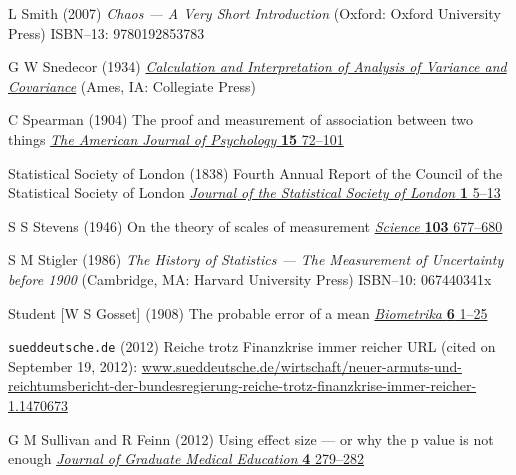 \begin{thebibliography}{99}
L Smith
(2007) \textit{Chaos --- A Very Short Introduction}
(Oxford: Oxford University Press)
ISBN--13: 9780192853783

G W Snedecor
(1934) 
\href{http://dx.doi.org/10.1037/13308-000}{\textit{Calculation 
and Interpretation of Analysis of Variance and Covariance}}
(Ames, IA: Collegiate Press)


C Spearman
(1904) The proof and measurement of association between two things
\href{http://www.jstor.org/stable/1412159}{\textit{The Ameri\-can 
Journal of Psychology} \textbf{15} 72--101}

Statistical Society of London
(1838) Fourth Annual Report of the Council of the Statistical 
Society of London
\href{http://www.jstor.org/stable/2337850}{\textit{Journal of the 
Statistical Society of London} \textbf{1} 5--13}

S S Stevens
(1946) On the theory of scales of measurement
\href{https://doi.org/10.1126/science.103.2684.677}{\textit{Science}
\textbf{103} 677--680}

S M Stigler
(1986) \textit{The History of Statistics --- The Measurement of 
Uncertainty before 1900} (Cambridge, MA: Harvard University 
Press)
ISBN--10: 067440341x

Student [W S Gosset]
(1908) The probable error of a mean
\href{http://dx.doi.org/10.1093/biomet/6.1.1}{\textit{Biometrika} 
\textbf{6} 1--25}

{\tt sueddeutsche.de} (2012)
Reiche trotz Finanzkrise immer reicher
URL (cited on September 19, 2012):
\href{http://www.sueddeutsche.de/wirtschaft/neuer-armuts-und-reichtumsbericht-der-bundesregierung-reiche-trotz-finanzkrise-immer-reicher-1.1470673}{www.sueddeutsche.de/wirtschaft/neuer-armuts-und-reichtumsbericht-der-bundesregierung-reiche-trotz-finanzkrise-immer-reicher-1.1470673}

G M Sullivan and R Feinn
(2012) Using effect size --- or why the p value is not enough
\href{https://doi.org/10.4300/JGME-D-12-00156.1}{\textit{Journal of
Graduate Medical Education} \textbf{4} 279--282}


\end{thebibliography}
